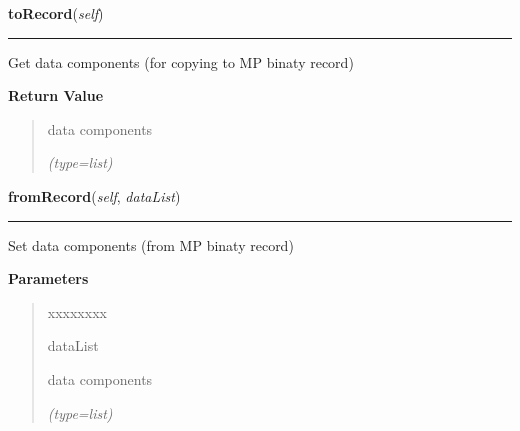     \label{gblfit:GblData:toRecord}

    \vspace{0.5ex}

\hspace{.8\funcindent}\begin{boxedminipage}{\funcwidth}

    \raggedright \textbf{toRecord}(\textit{self})

    \vspace{-1.5ex}

    \rule{\textwidth}{0.5\fboxrule}
\setlength{\parskip}{2ex}
    Get data components (for copying to MP binaty record)

\setlength{\parskip}{1ex}
      \textbf{Return Value}
    \vspace{-1ex}

      \begin{quote}
      data components

      {\it (type=list)}

      \end{quote}

    \end{boxedminipage}

    \label{gblfit:GblData:fromRecord}

    \vspace{0.5ex}

\hspace{.8\funcindent}\begin{boxedminipage}{\funcwidth}

    \raggedright \textbf{fromRecord}(\textit{self}, \textit{dataList})

    \vspace{-1.5ex}

    \rule{\textwidth}{0.5\fboxrule}
\setlength{\parskip}{2ex}
    Set data components (from MP binaty record)

\setlength{\parskip}{1ex}
      \textbf{Parameters}
      \vspace{-1ex}

      \begin{quote}
        \begin{Ventry}{xxxxxxxx}

          \item[dataList]

          data components

            {\it (type=list)}

        \end{Ventry}

      \end{quote}

    \end{boxedminipage}

